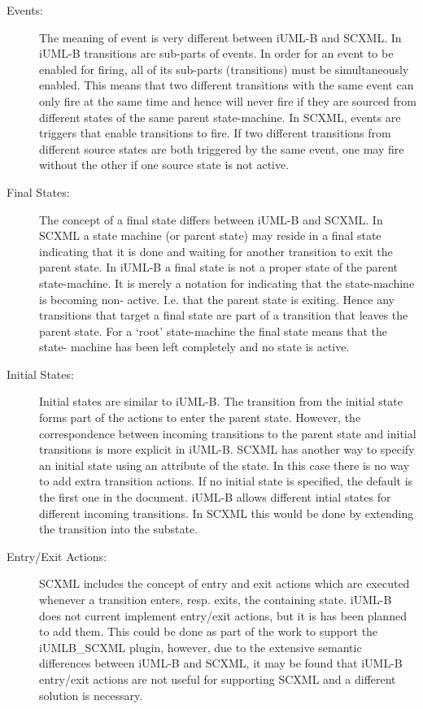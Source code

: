 \documentclass{easychair}
\begin{document}
\begin{description}
\item [Events:]
The meaning of event is very different between iUML-B 
and SCXML. In iUML-B transitions are sub-parts of 
events. In order for an event to be enabled for firing, 
all of its sub-parts (transitions) must be 
simultaneously enabled. This means that two different 
transitions with the same event can only fire at the 
same time and hence will never fire if they are sourced 
from different states of the same parent state-machine. 
In SCXML, events are triggers that enable transitions 
to fire. If two different transitions from different 
source states are both triggered by the same event, one 
may fire without the other if one source state is not 
active.

\item [Final States:]
The concept of a final state differs between iUML-B and 
SCXML. In SCXML a state machine (or parent state) may 
reside in a final state indicating that it is done and 
waiting for another transition to exit the parent 
state.  In iUML-B a final state is not a proper state 
of the parent state-machine. It is merely a notation 
for indicating that the state-machine is becoming non-
active. I.e. that the parent state is exiting. Hence 
any transitions that target a final state are part of a 
transition that leaves the parent state. For a ‘root’ 
state-machine the final state means that the state-
machine has been left completely and no state is active.

\item [Initial States:]
Initial states are similar to iUML-B. The transition 
from the initial state forms part of the actions to 
enter the parent state. However, the correspondence 
between incoming transitions to the parent state and 
initial transitions is more explicit in iUML-B. 
SCXML has another way to specify an initial state using 
an attribute of the state. In this case there is no way 
to add extra transition actions.
If no initial state is specified, the default is the 
first one in the document.
iUML-B allows different intial states for different 
incoming transitions. In SCXML this would be done by 
extending the transition into the substate.

\item [Entry/Exit Actions:]
SCXML includes the concept of entry and exit actions 
which are executed whenever a transition enters, resp. 
exits, the containing state. 
iUML-B does not current implement entry/exit actions,
but it is has been planned to add them.  This could be 
done as part of the work to support the iUMLB\_SCXML 
plugin, however, due to the extensive semantic 
differences between iUML-B and SCXML, it may be found 
that iUML-B entry/exit actions are not useful for 
supporting SCXML and a different solution is necessary.

\end{description}
\end{document}
